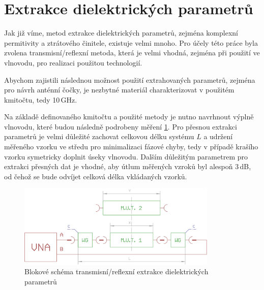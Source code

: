 \section{Extrakce dielektrických parametrů}
Jak již víme, metod extrakce dielektrických parametrů, zejména komplexní permitivity a ztrátového činitele, existuje velmi mnoho. Pro účely této práce byla zvolena transmisní/reflexní metoda, která je velmi vhodná, zejména při použití ve vlnovodu, pro realizaci použitou technologií.

Abychom zajistili následnou možnost použití extrahovaných parametrů, zejména pro návrh anténní čočky, je nezbytné materiál charakterizovat v použitém kmitočtu, tedy 10\,GHz.

Na základě definovaného kmitočtu a použité metody je nutno navrhnout výplně vlnovodu, které budou následně podrobeny měření \ref{fig:ExtractBlock}. Pro přesnou extrakci parametrů je velmi důležité zachovat celkovou délku systému $L$ a udržení měřeného vzorku ve středu pro minimalizaci fázové chyby, tedy v případě krašího vzorku symetricky doplnit úseky vlnovodu. Dalším důležitým parametrem pro extrakci přesných dat je vhodné, aby útlum měřených vzroků byl alespoň 3\,dB, od čehož se bude odvíjet celková délka vkládaných vzorků.

\begin{figure}[h]
\begin{center}
\includegraphics[width=9.5cm]{pics/ExtractBlock}
\caption{Blokové schéma transmisní/reflexní extrakce dielektrických parametrů}
\label{fig:ExtractBlock}
\end{center}
\end{figure} 




